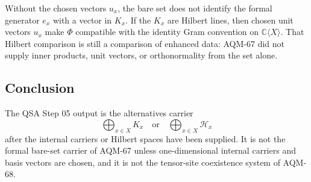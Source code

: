 Without the chosen vectors \(u_x\), the bare set does not identify the formal
generator \(e_x\) with a vector in \(K_x\).  If the \(K_x\) are Hilbert lines,
then chosen unit vectors \(u_x\) make \(\Phi\) compatible with the identity
Gram convention on \(\mathbb C\langle X\rangle\).  That Hilbert comparison is
still a comparison of enhanced data: AQM-67 did not supply inner products,
unit vectors, or orthonormality from the set alone.

\subsection{Conclusion}

The QSA Step 05 output is the alternatives carrier
\[
  \bigoplus_{x\in X}K_x
  \quad\text{or}\quad
  \bigoplus_{x\in X}\mathcal H_x
\]
after the internal carriers or Hilbert spaces have been supplied.  It is not
the formal bare-set carrier of AQM-67 unless one-dimensional internal carriers
and basis vectors are chosen, and it is not the tensor-site coexistence system
of AQM-68.

